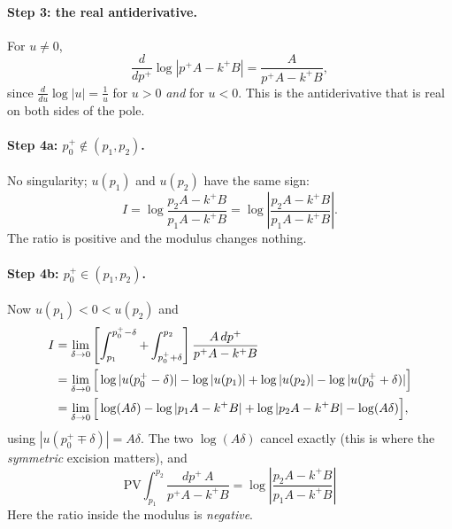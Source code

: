 \documentclass[11pt]{article}
\numberwithin{equation}{section}
\newcommand{\PV}{\mathrm{PV}}
\begin{document}
\paragraph{Step 3: the real antiderivative.} For $u\neq0$,
\begin{equation}
\frac{d}{dp^+}\log|p^+A-k^+B|=\frac{A}{p^+A-k^+B},
\end{equation}
since $\frac{d}{du}\log|u|=\frac1u$ for $u>0$ \emph{and} for $u<0$. This is the antiderivative that is real on both sides of the pole.

\paragraph{Step 4a: $p_0^+\notin(p_1,p_2)$.} No singularity; $u(p_1)$ and $u(p_2)$ have the same sign:
\begin{equation}
I=\log\frac{p_2A-k^+B}{p_1A-k^+B}=\log\left|\frac{p_2A-k^+B}{p_1A-k^+B}\right|.
\end{equation}
The ratio is positive and the modulus changes nothing.

\paragraph{Step 4b: $p_0^+\in(p_1,p_2)$.} Now $u(p_1)<0<u(p_2)$ and
\begin{align}
I&=\lim_{\delta\to0}\left[\int_{p_1}^{p_0^+-\delta}+\int_{p_0^++\delta}^{p_2}\right]\frac{A\,dp^+}{p^+A-k^+B}\notag\\
&=\lim_{\delta\to0}\Big[\log|u(p_0^+-\delta)|-\log|u(p_1)|+\log|u(p_2)|-\log|u(p_0^++\delta)|\Big]\notag\\
&=\lim_{\delta\to0}\Big[\log(A\delta)-\log|p_1A-k^+B|+\log|p_2A-k^+B|-\log(A\delta)\Big],
\end{align}
using $|u(p_0^+\mp\delta)|=A\delta$. The two $\log(A\delta)$ cancel exactly (this is where the \emph{symmetric} excision matters), and
\begin{equation}
\boxed{\;\PV\!\int_{p_1}^{p_2}\frac{dp^+\,A}{p^+A-k^+B}=\log\left|\frac{p_2A-k^+B}{p_1A-k^+B}\right|\;}\label{eq:main}
\end{equation}
Here the ratio inside the modulus is \emph{negative}.
\end{document}
